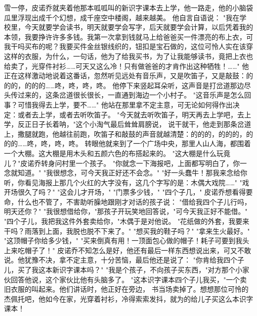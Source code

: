 \documentclass[12pt,UTF8]{ctexbook}
\begin{document}
雪一停，皮诺乔就夹着他那本呱呱叫的新识字课本去上学，他一路走，他的小脑袋瓜里浮现出成千个幻想，成千座空中楼阁，越来越美。
他自言自语说：
"我在学校里，今天就要学会读书，明天就要学会写字，后天就要学会计算，以后凭着我的本领，我要挣许许多多钱。我第一次拿到钱就马上给爸爸买一件漂亮的布上衣，可我干吗买布的呢？我要买件金丝银线织的，钮扣是宝石做的，这位可怜人实在该穿这样的衣服，为什么，一句话，他为了给我买书，为了让我能够读书，竟把上衣也给卖了，光穿件衬衫……可天又这么冷！只有做爸爸的才肯作出这种牺牲！……"
他正在这样激动地说着这番话，忽然听见远处有音乐声，又是吹笛子，又是敲鼓：的的的，的的的……咚，咚，咚，咚。
他停下来竖起耳朵听，这声音是打岔道那边尽头传过来的，这条岔道很长很长，一直通到海边一个小村子。
"这音乐声是怎么回事？可惜我得去上学，要不……"
他站在那里拿不定主意，可无论如何得作出决定：或者去上学，或者去听吹笛子。
"今天就去听吹笛子，明天再去上学吧，去上学，反正日子长着呐，"这个小淘气最后耸耸肩膀说，
说干就干，他走到那条岔道上，撒腿就跑，他越往前跑，吹笛子和敲鼓的声音就越清楚：的的的，的的的，的的的……咚，咚，咚，咚。
转眼他就来到了一个广场中央，那里人山人海，都围着一个大棚。这大棚是用木头和五颜六色的布搭起来的。
"这大棚是什么玩竟儿？"皮诺乔转身问村里一个孩子。
"你就念一下海报吧，上面都写明白了，你一念就知道。"
"我很想念，可今天我正好还不会念。"
"好一头蠢牛！那我来念给你听，你看见海报上那几个火红的大字没有，这几个字写的是：木偶大戏院……"
"戏开场很久了吗？"
"这会儿才开场，"
"门票多少钱，"
"四个子几，"
皮诺乔想看得要命，什么也不管了，不害助听臊地跟刚才对话的孩子说：
"借给我四个子儿行吗，明天还你？"
"我很想借给你，"那孩子开玩笑地回答说，"可今天我正好不能借。"
"四个子儿，我把我这件外套卖给你，"木偶于是对他说。
"花纸做的外套，我要来干吗？雨落到上面，我脱也脱不下来了。"
"想买我的鞋子吗？"
"拿来生火最好。"
"这顶帽子你给多少钱，"
"买来倒真有用！一顶面包心做的帽子！耗子可要到我头上来吃帽子了！"
皮诺乔不知怎么是好，他还有最后一样东西想说出来，可又不敢说。他犹豫不决，拿不定主意，十分苦恼，最后他还是说了：
"你肯给我四个子儿，买了我这本新识字课本吗？"
"我是个孩子，不向孩子买东西，"对方那个小家伙回答他说，这个家伙比他有头脑多了。
"这本识字课本四个子儿我买，"一个卖旧衣服的叫起来。他们讲话时，他正好在旁边，
书当场卖掉了。想想那位可怜的杰佩托吧，他如今在家，光穿着衬衫，冷得索索发抖，就为的给儿子买这么本识字课本！

\chapter{}
\end{document}
